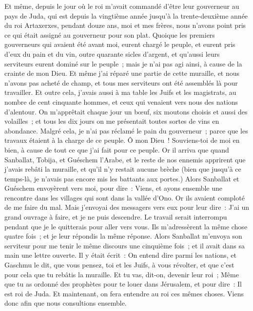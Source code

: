 \begin{multicols}{2}
Et même, depuis le jour où le roi m'avait commandé d'être leur gouverneur au pays de Juda, qui est depuis la vingtième année jusqu'à la trente-deuxième année du roi Artaxerxes, pendant douze ans, moi et mes frères, nous n'avons point pris ce qui était assigné au gouverneur pour son plat.
Quoique les premiers gouverneurs qui avaient été avant moi, eurent chargé le peuple, et eurent pris d'eux du pain et du vin, outre quarante sicles d'argent, et qu'aussi leurs serviteurs eurent dominé sur le peuple~; mais je n'ai pas agi ainsi, à cause de la crainte de mon Dieu.
Et même j'ai réparé une partie de cette muraille, et nous n'avons pas acheté de champ, et tous mes serviteurs ont été assemblés là pour travailler.
Et outre cela, j'avais aussi à ma table les Juifs et les magistrats, au nombre de cent cinquante hommes, et ceux qui venaient vers nous des nations d'alentour.
On m'apprêtait chaque jour un bœuf, six moutons choisis et aussi des volailles~; et tous les dix jours on me présentait toutes sortes de vins en abondance. Malgré cela, je n'ai pas réclamé le pain du gouverneur~; parce que les travaux étaient à la charge de ce peuple.
Ô mon Dieu~! Souviens-toi de moi en bien, à cause de tout ce que j'ai fait pour ce peuple.
\VerseOne{}Or il arriva que quand Sanballat, Tobija, et Guéschem l'Arabe, et le reste de nos ennemis apprirent que j'avais rebâti la muraille, et qu'il n'y restait aucune brèche (bien que jusqu'à ce temps-là, je n'avais pas encore mis les battants aux portes.)
Alors Sanballat et Guéschem envoyèrent vers moi, pour dire~: Viens, et ayons ensemble une rencontre dans les villages qui sont dans la vallée d'Ono. Or ils avaient comploté de me faire du mal.
Mais j'envoyai des messagers vers eux pour leur dire~: J'ai un grand ouvrage à faire, et je ne puis descendre. Le travail serait interrompu pendant que je le quitterais pour aller vers vous.
Ils m'adressèrent la même chose quatre fois~; et je leur répondis la même réponse.
Alors Sanballat m'envoya son serviteur pour me tenir le même discours une cinquième fois~; et il avait dans sa main une lettre ouverte.
Il y était écrit~: On entend dire parmi les nations, et Gaschmu le dit, que vous pensez, toi et les Juifs, à vous révolter, et que c'est pour cela que tu rebâtis la muraille. Et tu vas, dit-on, devenir leur roi~;
Même que tu as ordonné des prophètes pour te louer dans Jérusalem, et pour dire~: Il est roi de Juda. Et maintenant, on fera entendre au roi ces mêmes choses. Viens donc afin que nous consultions ensemble.

\end{multicols}
